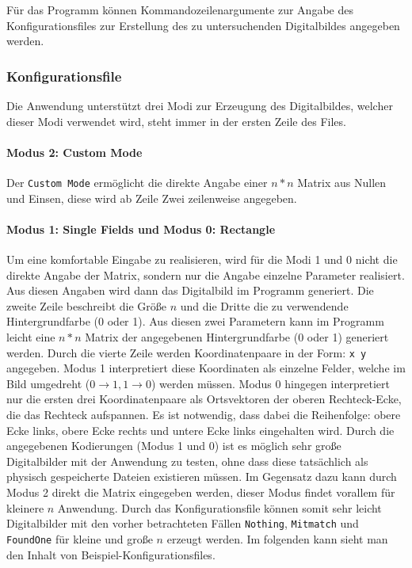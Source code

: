 Für das Programm können Kommandozeilenargumente zur Angabe des Konfigurationsfiles zur Erstellung des zu untersuchenden Digitalbildes angegeben werden.

\subsubsection{Konfigurationsfile}
Die Anwendung unterstützt drei Modi zur Erzeugung des Digitalbildes, welcher dieser Modi verwendet wird, steht immer in der ersten Zeile des Files.
\paragraph{Modus 2: Custom Mode}Der \texttt{Custom Mode} ermöglicht die direkte Angabe einer $n*n$ Matrix aus Nullen und Einsen, diese wird ab Zeile Zwei zeilenweise angegeben.
\paragraph{Modus 1: Single Fields und Modus 0: Rectangle}
Um eine komfortable Eingabe zu realisieren, wird für die Modi 1 und 0 nicht die direkte Angabe der Matrix, sondern nur die Angabe einzelne Parameter realisiert.
Aus diesen Angaben wird dann das Digitalbild im Programm generiert.
Die zweite Zeile beschreibt die Größe $n$ und die Dritte die zu verwendende Hintergrundfarbe (0 oder 1). 
Aus diesen zwei Parametern kann im Programm leicht eine $n*n$ Matrix der angegebenen Hintergrundfarbe (0 oder 1) generiert werden.
Durch die vierte Zeile werden Koordinatenpaare in der Form: \texttt{x y} angegeben. Modus 1 interpretiert diese Koordinaten als einzelne Felder, welche im Bild umgedreht \linebreak ($0 \rightarrow 1,1 \rightarrow 0$) werden müssen. 
Modus 0 hingegen interpretiert nur die ersten drei Koordinatenpaare als Ortsvektoren der oberen Rechteck-Ecke, die das Rechteck aufspannen. 
Es ist notwendig, dass dabei die Reihenfolge: obere Ecke links, obere Ecke rechts und untere Ecke links eingehalten wird.
Durch die angegebenen Kodierungen (Modus 1 und 0) ist es möglich sehr große Digitalbilder mit der Anwendung zu testen, ohne dass diese tatsächlich  als physisch gespeicherte Dateien existieren müssen. 
Im Gegensatz dazu kann durch Modus 2 direkt die Matrix eingegeben werden, dieser Modus findet vorallem für kleinere $n$ Anwendung. 
Durch das Konfigurationsfile können somit sehr leicht Digitalbilder mit den vorher betrachteten Fällen \texttt{Nothing}, \texttt{Mitmatch} und \texttt{FoundOne} für kleine und große $n$ erzeugt werden. Im folgenden kann sieht man den Inhalt von Beispiel-Konfigurationsfiles.

